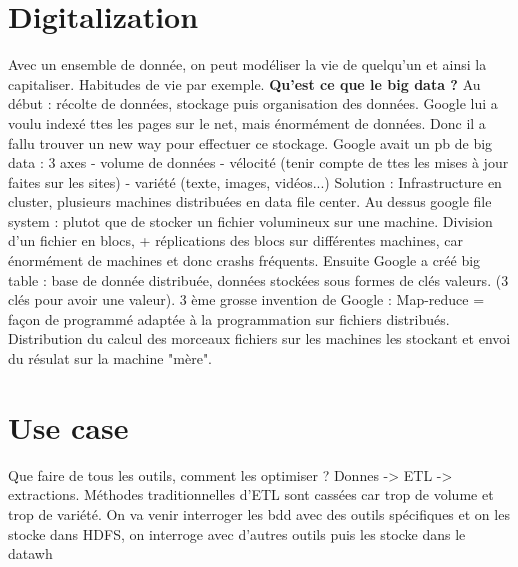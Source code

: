 \documentclass[10pt,a4paper]{article}
\begin{document}
\section{Digitalization}
Avec un ensemble de donnée, on peut modéliser la vie de quelqu'un et ainsi la capitaliser. Habitudes de vie par exemple. 
\textbf{Qu'est ce que le big data ? }
Au début : récolte de données, stockage puis organisation des données.
Google lui a voulu indexé ttes les pages sur le net, mais énormément de données. Donc il a fallu trouver un new way pour effectuer ce stockage. Google avait un pb de big data : 3 axes 
- volume de données
- vélocité (tenir compte de ttes les mises à jour faites sur les sites)
- variété (texte, images, vidéos...)
Solution : Infrastructure en cluster, plusieurs machines distribuées en data file center. Au dessus google file system : plutot que de stocker un fichier volumineux sur une machine. Division d'un fichier en blocs, + réplications des blocs sur différentes machines, car énormément de machines et donc crashs fréquents. Ensuite Google a créé big table : base de donnée distribuée, données stockées sous formes de clés valeurs. (3 clés pour avoir une valeur). 
3 ème grosse invention de Google : Map-reduce = façon de programmé adaptée à la programmation sur fichiers distribués. Distribution du calcul des morceaux fichiers sur les machines les stockant et envoi du résulat sur la machine "mère". 
\section{Use case}
Que faire de tous les outils, comment les optimiser ? 
Donnes -> ETL -> extractions.
Méthodes traditionnelles d'ETL sont cassées car trop de volume et trop de variété. 
On va venir interroger les bdd avec des outils spécifiques et on les stocke dans HDFS, on interroge avec d'autres outils puis les stocke dans le datawh
\end{document}
